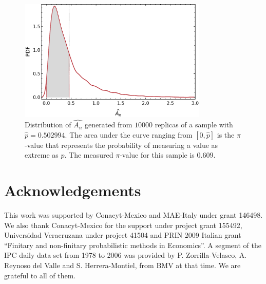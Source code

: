 \documentclass[a4paper]{jpconf}
\begin{document}
\begin{appendices}
\begin{figure}
\begin{center}
\includegraphics[width=9cm]{img/ad_dist}
\end{center}
\caption{Distribution of $\hat{A_n}$ generated from $10000$ replicas of a sample with $\hat{p} = 0.502994$. The area under the curve ranging from $[0,\hat{p}]$ is the $\pi$-value that represents the probability of measuring a value as extreme as $\hat{p}$. The measured $\pi$-value for this sample is $0.609$.}
\label{fig:ad_dist}
\end{figure}


\end{appendices}


\section*{Acknowledgements}
This work was supported by Conacyt-Mexico and MAE-Italy under grant 146498. We also thank Conacyt-Mexico for the support under  project grant 155492, Universidad Veracruzana under project 41504 and PRIN 2009 Italian grant ``Finitary and non-finitary probabilistic methods in Economics''. A segment of the IPC daily data set from 1978 to 2006 was provided by P. Zorrilla-Velasco, A. Reynoso del Valle and S. Herrera-Montiel, from BMV at that time. We are grateful to all of them.
\end{document}
